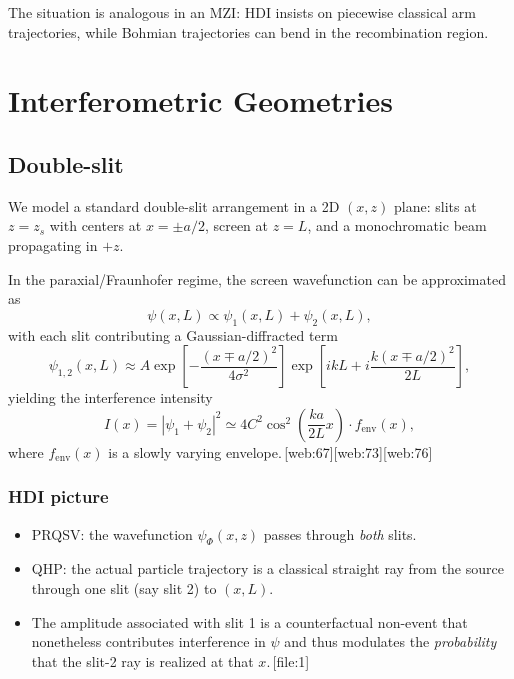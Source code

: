 \documentclass[11pt]{article}
\begin{document}
The situation is analogous in an MZI: HDI insists on piecewise classical arm trajectories, while Bohmian trajectories can bend in the recombination region.

\section{Interferometric Geometries}

\subsection{Double-slit}

We model a standard double-slit arrangement in a 2D \((x,z)\) plane: slits at \(z = z_s\) with centers at \(x=\pm a/2\), screen at \(z=L\), and a monochromatic beam propagating in \(+z\).

In the paraxial/Fraunhofer regime, the screen wavefunction can be approximated as
\begin{equation}
\psi(x,L) \propto \psi_1(x,L) + \psi_2(x,L),
\end{equation}
with each slit contributing a Gaussian-diffracted term
\begin{equation}
\psi_{1,2}(x,L) \approx A \exp\left[-\frac{(x\mp a/2)^2}{4\sigma^2}\right]
\exp\left[i k L + i\frac{k(x \mp a/2)^2}{2L}\right],
\end{equation}
yielding the interference intensity
\begin{equation}
I(x) = |\psi_1 + \psi_2|^2
\simeq 4C^2\cos^2\left(\frac{k a}{2L}x\right)\cdot f_{\text{env}}(x),\label{eq:double-slit-intensity}
\end{equation}
where \(f_{\text{env}}(x)\) is a slowly varying envelope.\,[web:67][web:73][web:76]

\subsubsection{HDI picture}

\begin{itemize}[leftmargin=*]
  \item PRQSV: the wavefunction \(\psi_\Phi(x,z)\) passes through \emph{both} slits.
  \item QHP: the actual particle trajectory is a classical straight ray from the source through one slit (say slit 2) to \((x,L)\).
  \item The amplitude associated with slit 1 is a counterfactual non-event that nonetheless contributes interference in \(\psi\) and thus modulates the \emph{probability} that the slit-2 ray is realized at that \(x\).\,[file:1]
\end{itemize}
\end{document}
